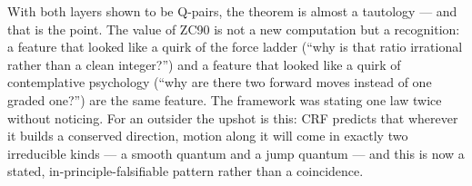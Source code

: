 \documentclass[12pt, a4paper]{article}
\begin{document}
With both layers shown to be Q-pairs, the theorem is almost a tautology
--- and that is the point. The value of ZC90 is not a new computation but
a recognition: a feature that looked like a quirk of the force ladder
(``why is that ratio irrational rather than a clean integer?'') and a
feature that looked like a quirk of contemplative psychology (``why are
there two forward moves instead of one graded one?'') are the same
feature. The framework was stating one law twice without noticing. For an
outsider the upshot is this: CRF predicts that wherever it builds a
conserved direction, motion along it will come in exactly two
irreducible kinds --- a smooth quantum and a jump quantum --- and this is
now a stated, in-principle-falsifiable pattern rather than a coincidence.
\end{document}
